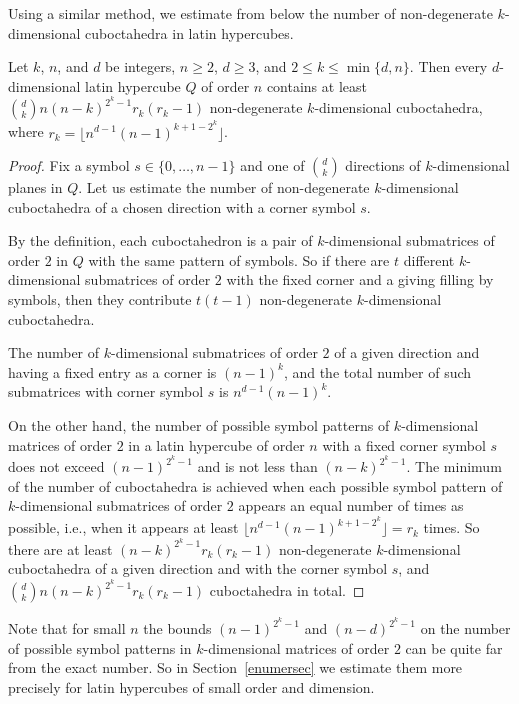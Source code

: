 \documentclass[a4paper]{article}
\begin{document}
Using a similar method, we estimate from below the number of non-degenerate $k$-dimensional cuboctahedra in latin hypercubes.


\begin{utv} \label{kdimnondeg}
Let  $k$, $n$, and $d$ be integers,  $n \geq 2$,  $d \geq  3$,  and $2 \leq k \leq \min \{d ,n\}$.
Then  every $d$-dimensional   latin hypercube  $Q$ of order $n$ contains at least $ {d \choose k} n (n-k)^{2^k - 1} r_k(r_k-1)$ non-degenerate $k$-dimensional cuboctahedra, where $r_k = \lfloor  n^{d-1} (n-1)^{k + 1 - 2^k}  \rfloor$.
\end{utv}

\begin{proof}
Fix a symbol $s \in \{ 0,  \ldots, n-1\}$ and one of  ${d \choose k}$ directions of $k$-dimensional planes in $Q$. Let us estimate the number of non-degenerate $k$-dimensional cuboctahedra  of a chosen direction with a corner symbol $s$. 

By the definition, each cuboctahedron is a pair of $k$-dimensional submatrices of order $2$ in $Q$ with the same pattern of symbols.  So if there are $t$ different $k$-dimensional submatrices of order $2$ with the fixed corner and a giving filling by symbols, then they contribute $t(t-1)$   non-degenerate $k$-dimensional cuboctahedra. 

The number of $k$-dimensional  submatrices of order $2$ of a given direction  and  having  a fixed entry as a corner is $(n-1)^k$, and the total number of such submatrices with corner symbol $s$ is $ n^{d-1} (n-1)^k$. 

On the other hand, the number of possible  symbol patterns of $k$-dimensional matrices of order $2$  in a latin hypercube of order $n$ with a fixed corner symbol $s$   does not exceed $(n-1)^{2^k -1}$ and is not less than $(n-k)^{2^k-1}$.  The minimum of the number of cuboctahedra is achieved when each possible symbol pattern of $k$-dimensional submatrices of order $2$ appears an equal number of times as possible, i.e., when it appears at least  $\lfloor  n^{d-1} (n-1)^{k + 1 - 2^k}  \rfloor = r_k$ times.   So there are at least $(n-k)^{2^k-1} r_k(r_k-1)$ non-degenerate  $k$-dimensional  cuboctahedra of a given direction and with the corner  symbol $s$, and $ {d \choose k} n (n-k)^{2^k-1} r_k(r_k-1)$  cuboctahedra in total.



\end{proof}


Note that for small $n$ the bounds $(n-1)^{2^k-1}$ and $(n - d)^{2^k-1}$ on the number of possible symbol patterns  in $k$-dimensional matrices of order $2$ 
 can be quite far from the exact number. So  in Section~\ref{enumersec}  we estimate them more precisely  for latin hypercubes of small order   and dimension.
 
\end{document}

